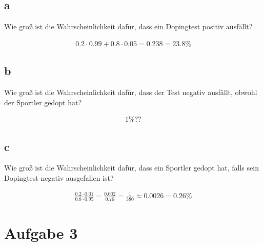 \begin{center}    
\end{center}

\subsection{a}

Wie groß ist die Wahrscheinlichkeit dafür, dass ein Dopingtest positiv ausfällt?

\begin{align*}
    0.2 \cdot 0.99 + 0.8 \cdot 0.05 = 0.238 = 23.8\%
\end{align*}

\subsection{b}

Wie groß ist die Wahrscheinlichkeit dafür, dass der Test negativ ausfällt, obwohl der Sportler gedopt hat?

\begin{align*}
    1\%??
\end{align*}

\subsection{c}

Wie groß ist die Wahrscheinlichkeit dafür, dass ein Sportler gedopt hat, falls sein Dopingtest negativ ausgefallen ist?

\begin{align*}
    \frac{0.2 \cdot 0.01}{0.8 \cdot 0.95} = \frac{0.002}{0.76} = \frac{1}{380} \approx 0.0026 = 0.26\%
\end{align*}

\section{Aufgabe 3}

